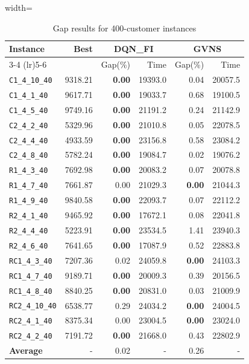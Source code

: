\begin{table}[ht]
\centering
\small
\setlength{\tabcolsep}{5pt}
\caption{Gap results for 400-customer instances}
\vspace{4mm}
\begin{adjustbox}{width=\textwidth}
\begin{tabular}{l r r r @{\hspace{8pt}} r r @{\hspace{8pt}}}
\toprule
\multirow{2}{*}{Instance} & \multirow{2}{*}{Best} & \multicolumn{2}{c}{DQN\_FI} & \multicolumn{2}{c}{GVNS} \\
\cmidrule(lr){3-4} \cmidrule(lr){5-6}
 &  & Gap(\%) & Time & Gap(\%) & Time \\
\midrule
\texttt{C1\_4\_10\_40} & 9318.21 & \textbf{0.00} & 19393.0 & 0.04 & 20057.5 \\
\texttt{C1\_4\_1\_40} & 9617.71 & \textbf{0.00} & 19033.7 & 0.68 & 19100.5 \\
\texttt{C1\_4\_5\_40} & 9749.16 & \textbf{0.00} & 21191.2 & 0.24 & 21142.9 \\
\texttt{C2\_4\_2\_40} & 5329.96 & \textbf{0.00} & 21010.8 & 0.05 & 22078.5 \\
\texttt{C2\_4\_4\_40} & 4933.59 & \textbf{0.00} & 23156.8 & 0.58 & 23084.2 \\
\texttt{C2\_4\_8\_40} & 5782.24 & \textbf{0.00} & 19084.7 & 0.02 & 19076.2 \\
\texttt{R1\_4\_3\_40} & 7692.98 & \textbf{0.00} & 20083.2 & 0.07 & 20078.8 \\
\texttt{R1\_4\_7\_40} & 7661.87 & 0.00 & 21029.3 & \textbf{0.00} & 21044.3 \\
\texttt{R1\_4\_9\_40} & 9840.58 & \textbf{0.00} & 22093.7 & 0.07 & 22112.2 \\
\texttt{R2\_4\_1\_40} & 9465.92 & \textbf{0.00} & 17672.1 & 0.08 & 22041.8 \\
\texttt{R2\_4\_4\_40} & 5223.91 & \textbf{0.00} & 23534.5 & 1.41 & 23940.3 \\
\texttt{R2\_4\_6\_40} & 7641.65 & \textbf{0.00} & 17087.9 & 0.52 & 22883.8 \\
\texttt{RC1\_4\_3\_40} & 7207.36 & 0.02 & 24059.8 & \textbf{0.00} & 24103.3 \\
\texttt{RC1\_4\_7\_40} & 9189.71 & \textbf{0.00} & 20009.3 & 0.39 & 20156.5 \\
\texttt{RC1\_4\_8\_40} & 8840.25 & \textbf{0.00} & 20831.0 & 0.03 & 21009.9 \\
\texttt{RC2\_4\_10\_40} & 6538.77 & 0.29 & 24034.2 & \textbf{0.00} & 24004.5 \\
\texttt{RC2\_4\_1\_40} & 8375.34 & 0.00 & 23004.5 & \textbf{0.00} & 23024.0 \\
\texttt{RC2\_4\_2\_40} & 7191.72 & \textbf{0.00} & 21668.0 & 0.43 & 22802.9 \\
\midrule
\textbf{Average} & - & 0.02 & - & 0.26 & - \\
\bottomrule
\end{tabular}
\end{adjustbox}
\end{table}